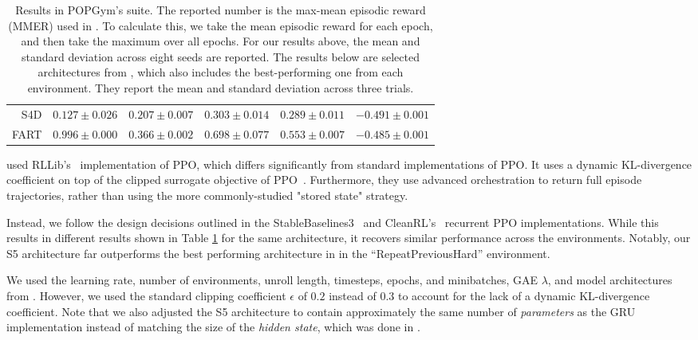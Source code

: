 \documentclass{article}
\begin{document}
\begin{table}[ht!]
\begin{tabular}{r|ccccc}
S4D        & $0.127 \pm 0.026$          & $0.207 \pm 0.007$          & $0.303 \pm 0.014$          & $0.289 \pm 0.011$          & $-0.491 \pm 0.001$         \\
FART       & $\mathbf{0.996 \pm 0.000}$ & $0.366 \pm 0.002$          & $0.698 \pm 0.077$          & $0.553 \pm 0.007$          & $-0.485 \pm 0.001$        
\end{tabular}
\vspace{1em}
\caption{Results in POPGym's suite. The reported number is the max-mean episodic reward (MMER) used in \citet{morad2023popgym}. To calculate this, we take the mean episodic reward for each epoch, and then take the maximum
over all epochs. For our results above, the mean and standard deviation across eight seeds are reported. The results below are selected architectures from \citet{morad2023popgym}, which also includes the best-performing one from each environment. They report the mean and standard deviation across three trials.}
\vspace{-1em}
\label{table:popgym-results-app}
\end{table}


\citet{morad2023popgym} used RLLib's~\citep{liang2018rllib} implementation of PPO, which differs significantly from standard implementations of PPO. It uses a dynamic KL-divergence coefficient on top of the clipped surrogate objective of PPO~\citep{ppo}. Furthermore, they use advanced orchestration to return full episode trajectories, rather than using the more commonly-studied "stored state" \cite{kapturowski2018recurrent} strategy. 

Instead, we follow the design decisions outlined in the StableBaselines3~\citep{stable-baselines3} and CleanRL's~\citep{huang2022cleanrl} recurrent PPO implementations. While this results in different results shown in Table \ref{table:popgym-results-app} for the same architecture, it recovers similar performance across the environments. Notably, our S5 architecture far outperforms the best performing architecture in \citet{morad2023popgym} in the ``RepeatPreviousHard'' environment.

We used the learning rate, number of environments, unroll length, timesteps, epochs, and minibatches, GAE $\lambda$, and model architectures from \citet{morad2023popgym}. However, we used the standard clipping coefficient $\epsilon$ of $0.2$ instead of $0.3$ to account for the lack of a dynamic KL-divergence coefficient. Note that we also adjusted the S5 architecture to contain approximately the same number of \textit{parameters} as the GRU implementation instead of matching the size of the \textit{hidden state}, which was done in \citet{morad2023popgym}.
\end{document}
